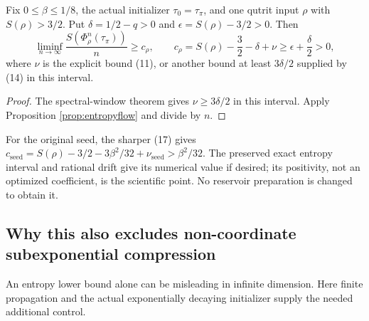 \begin{theorem}
\label{thm:entropy}
Fix $0\le\beta\le1/8$, the actual initializer $\tau_0=\tau_\pi$, and
one qutrit input $\rho$ with $S(\rho)>3/2$. Put
$\delta=1/2-q>0$ and $\epsilon=S(\rho)-3/2>0$. Then
\[
 \liminf_{n\to\infty}\frac{S(\Phi_\rho^n(\tau_\pi))}{n}
 \ge c_\rho,\qquad
 c_\rho=S(\rho)-\frac32-\delta+\nu
 \ge\epsilon+\frac{\delta}{2}>0,
 \tag{E6}
\]
where $\nu$ is the explicit bound (11), or another bound at least
$3\delta/2$ supplied by (14) in this interval.
\end{theorem}
\begin{proof}
The spectral-window theorem gives $\nu\ge3\delta/2$ in this interval.
Apply Proposition \ref{prop:entropyflow} and divide by $n$.
\end{proof}

For the original seed, the sharper (17) gives
$c_{\mathrm{seed}}=S(\rho)-3/2-3\beta^2/32+\nu_{\mathrm{seed}}
> \beta^2/32$.
The preserved exact entropy interval and rational drift give its numerical
value if desired; its positivity, not an optimized coefficient, is the
scientific point. No reservoir preparation is changed to obtain it.

\subsection{Why this also excludes non-coordinate subexponential compression}

An entropy lower bound alone can be misleading in infinite dimension.
Here finite propagation and the actual exponentially decaying initializer
supply the needed additional control.

